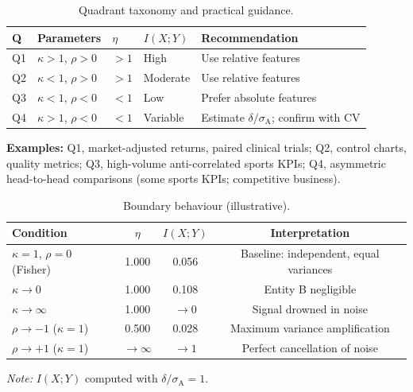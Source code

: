 \begin{table}[p]
  \centering
  \caption{Quadrant taxonomy and practical guidance.}
  \label{tab:quadrants}
  \begin{tabular}{@{}lllll@{}}
    \toprule
    \textbf{Q} & \textbf{Parameters} & $\eta$ & $I(X;Y)$ & \textbf{Recommendation} \\
    \midrule
    Q1 & $\kappa>1$, $\rho>0$  & $>1$  & High     & Use relative features \\
    Q2 & $\kappa<1$, $\rho>0$  & $>1$  & Moderate & Use relative features \\
    Q3 & $\kappa<1$, $\rho<0$  & $<1$  & Low      & Prefer absolute features \\
    Q4 & $\kappa>1$, $\rho<0$  & $<1$  & Variable & Estimate $\delta/\sigma_{\mathrm{A}}$; confirm with CV \\
    \bottomrule
  \end{tabular}

  \medskip
  \begin{minipage}{0.95\linewidth}\small
    \textbf{Examples:} Q1, market-adjusted returns, paired clinical trials; Q2, control charts, quality metrics; Q3, high-volume anti-correlated sports KPIs; Q4, asymmetric head-to-head comparisons (some sports KPIs; competitive business).
  \end{minipage}
\end{table}

\begin{table}[p]
  \centering
  \caption{Boundary behaviour (illustrative).}
  \label{tab:boundary}
  \begin{tabular}{@{}lccc@{}}
    \toprule
    \textbf{Condition} & $\eta$ & $I(X;Y)$ & \textbf{Interpretation} \\
    \midrule
    $\kappa=1$, $\rho=0$ (Fisher) & 1.000 & 0.056 & Baseline: independent, equal variances \\
    $\kappa\to 0$                 & 1.000 & 0.108 & Entity B negligible \\
    $\kappa\to\infty$             & 1.000 & $\to 0$ & Signal drowned in noise \\
    $\rho\to -1$ ($\kappa=1$)     & 0.500 & 0.028 & Maximum variance amplification \\
    $\rho\to +1$ ($\kappa=1$)     & $\to\infty$ & $\to 1$ & Perfect cancellation of noise \\
    \bottomrule
  \end{tabular}

  \medskip
  \begin{minipage}{0.95\linewidth}\small
    \textit{Note:} $I(X;Y)$ computed with $\delta/\sigma_{\mathrm{A}}=1$.
  \end{minipage}
\end{table}

